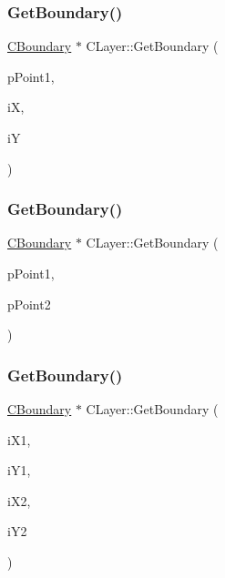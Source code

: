 \mbox{\label{classCLayer_abd9462b68d39534ab18b80c89b083f6c}} 
\subsubsection{\texorpdfstring{GetBoundary()}{GetBoundary()}\hspace{0.1cm}{\footnotesize\ttfamily [2/5]}}
{\footnotesize\ttfamily \mbox{\hyperlink{classCBoundary}{C\+Boundary}} $\ast$ C\+Layer\+::\+Get\+Boundary (\begin{DoxyParamCaption}\item[{\mbox{\hyperlink{classCPoint}{C\+Point}} $\ast$}]{p\+Point1,  }\item[{int}]{iX,  }\item[{int}]{iY }\end{DoxyParamCaption})}

\mbox{\label{classCLayer_a7e70b99323a1449834f7ba6a66f27d30}} 
\subsubsection{\texorpdfstring{GetBoundary()}{GetBoundary()}\hspace{0.1cm}{\footnotesize\ttfamily [3/5]}}
{\footnotesize\ttfamily \mbox{\hyperlink{classCBoundary}{C\+Boundary}} $\ast$ C\+Layer\+::\+Get\+Boundary (\begin{DoxyParamCaption}\item[{\mbox{\hyperlink{classCPoint}{C\+Point}} $\ast$}]{p\+Point1,  }\item[{\mbox{\hyperlink{classCPoint}{C\+Point}} $\ast$}]{p\+Point2 }\end{DoxyParamCaption})\hspace{0.3cm}{\ttfamily [inline]}}

\mbox{\label{classCLayer_ad69f17c6c80810ffa1527544bc3fc6a7}} 
\subsubsection{\texorpdfstring{GetBoundary()}{GetBoundary()}\hspace{0.1cm}{\footnotesize\ttfamily [4/5]}}
{\footnotesize\ttfamily \mbox{\hyperlink{classCBoundary}{C\+Boundary}} $\ast$ C\+Layer\+::\+Get\+Boundary (\begin{DoxyParamCaption}\item[{int}]{i\+X1,  }\item[{int}]{i\+Y1,  }\item[{int}]{i\+X2,  }\item[{int}]{i\+Y2 }\end{DoxyParamCaption})\hspace{0.3cm}{\ttfamily [inline]}}

